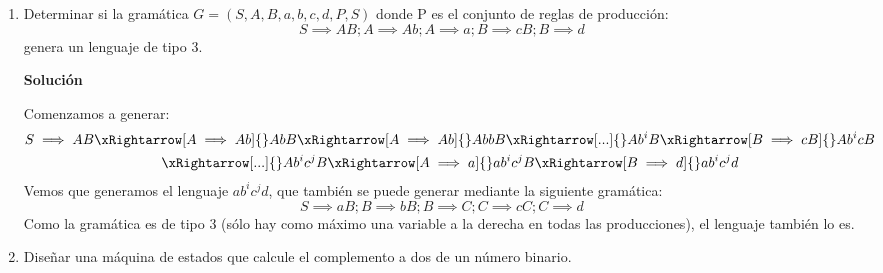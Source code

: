 \documentclass[12pt,spanish]{article}
\newenvironment{solution}{
	\par
	\textbf{Solución}
	\par
	\begin{center}
}
{
	\end{center}
}
\begin{document}
\begin{enumerate}
	\item Determinar si la gramática $G=({S,A,B},{a,b,c,d},P,S)$ donde P es el conjunto de reglas de producción:
	\[
		S \implies AB ; A \implies Ab ; A \implies a ; B \implies cB ; B \implies d
	\]
	genera un lenguaje de tipo 3.
	\begin{solution}
		Comenzamos a generar:
		\begin{gather*}
			S \implies AB \xRightarrow[A \implies Ab]{} AbB \xRightarrow[A \implies Ab]{} AbbB \xRightarrow[...]{} Ab^iB \xRightarrow[B \implies cB]{} Ab^icB \\ \xRightarrow[...]{} Ab^ic^jB \xRightarrow[A \implies a]{} ab^ic^jB \xRightarrow[B \implies d]{} ab^ic^jd
		\end{gather*}
		Vemos que generamos el lenguaje ${ab^ic^jd}$, que también se puede generar mediante la siguiente gramática:
		\[
			S \implies aB ; B \implies bB ; B \implies C ; C \implies cC ; C \implies d
		\]
		Como la gramática es de tipo 3 (sólo hay como máximo una variable a la derecha en todas las producciones), el lenguaje también lo es.
	\end{solution}

	\item Diseñar una máquina de estados que calcule el complemento a dos de un número binario.


\end{enumerate}
\end{document}
